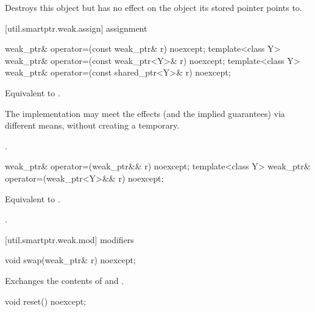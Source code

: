 \begin{itemdescr}
\pnum\effects  Destroys this  object but has no
effect on the object its stored pointer points to.
\end{itemdescr}

[util.smartptr.weak.assign]{ assignment}

%
%
\begin{itemdecl}
weak_ptr& operator=(const weak_ptr& r) noexcept;
template<class Y> weak_ptr& operator=(const weak_ptr<Y>& r) noexcept;
template<class Y> weak_ptr& operator=(const shared_ptr<Y>& r) noexcept;
\end{itemdecl}

\begin{itemdescr}
\pnum\effects  Equivalent to .

\pnum\notes  The implementation may meet the effects (and the
implied guarantees) via different means, without creating a temporary.

\pnum\returns  {}.
\end{itemdescr}

%
%
\begin{itemdecl}
weak_ptr& operator=(weak_ptr&& r) noexcept;
template<class Y> weak_ptr& operator=(weak_ptr<Y>&& r) noexcept;
\end{itemdecl}

\begin{itemdescr}
\pnum\effects  Equivalent to .

\pnum\returns  {}.
\end{itemdescr}

[util.smartptr.weak.mod]{ modifiers}
%
%
\begin{itemdecl}
void swap(weak_ptr& r) noexcept;
\end{itemdecl}

\begin{itemdescr}
\pnum\effects  Exchanges the contents of  and .
\end{itemdescr}

%
%
\begin{itemdecl}
void reset() noexcept;
\end{itemdecl}

